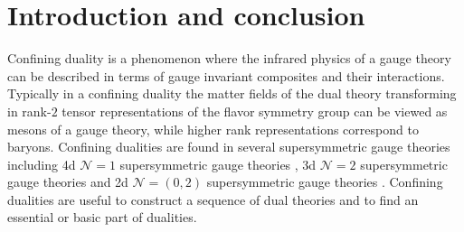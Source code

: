\documentclass[12pt]{article}
\numberwithin{equation}{section}
\begin{document}
\section{Introduction and conclusion}
\label{sec_intro}

Confining duality is a phenomenon where 
the infrared physics of a gauge theory can be described in terms of gauge invariant composites and their interactions. 
Typically in a confining duality the matter fields of the dual theory transforming in rank-$2$ tensor representations of the flavor symmetry group can be viewed as mesons of a gauge theory, while higher rank representations correspond to baryons. 
Confining dualities are found 
in several supersymmetric gauge theories including 
4d $\mathcal{N}=1$ supersymmetric gauge theories 
\cite{Intriligator:1995ne,Berkooz:1995km,Pouliot:1995me,Luty:1996cg,Csaki:1996sm,Csaki:1996zb,Terning:1997jj,Garcia-Etxebarria:2012ypj,Garcia-Etxebarria:2013tba,Etxebarria:2021lmq,Bajeot:2022lah,Bajeot:2022kwt,Bottini:2022vpy}, 
3d $\mathcal{N}=2$ supersymmetric gauge theories 
\cite{Amariti:2015kha,Nii:2016jzi,Pasquetti:2019uop,Pasquetti:2019tix,Benvenuti:2020gvy,Benvenuti:2021nwt,Bajeot:2022lah} 
and 2d $\mathcal{N}=(0,2)$ supersymmetric gauge theories \cite{Sacchi:2020pet}. 
Confining dualities are useful to construct a sequence of dual theories and to find an essential or basic part of dualities. 
\end{document}
